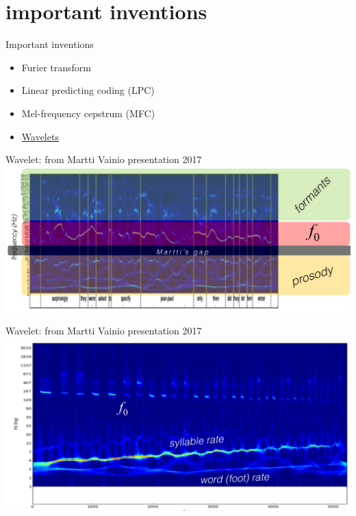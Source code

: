 \section{important inventions}
\begin{frame}{Important inventions}
\begin{itemize}
\item Furier transform
\item Linear predicting coding (LPC)
\item Mel-frequency cepstrum (MFC)
\item \href{http://stevehanov.ca/wavelet/}{Wavelets}
\end{itemize}
\end{frame}

\begin{frame}{Wavelet: from Martti Vainio presentation 2017}
\vfill
\centering
\includegraphics[width=\linewidth]{08-wavelet}
\end{frame}

\begin{frame}{Wavelet: from Martti Vainio presentation 2017}
\vfill
\centering
\includegraphics[width=\linewidth]{09-wavelet}
\end{frame}

